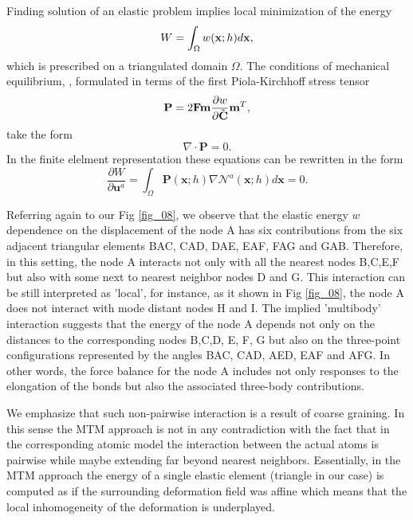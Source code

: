 \documentclass[aps,
superscriptaddress,notitlepage]{revtex4-1}
\begin{document}
Finding  solution of an elastic problem implies  local minimization of the energy 
\begin{equation}
W=\int_{\Omega}w({\bf x}; h)  d\mathbf{x}, 
\end{equation}
which is prescribed on a triangulated  domain \(\Omega\).   The conditions of mechanical equilibrium, , formulated     in terms  of the first Piola-Kirchhoff stress tensor 
\begin{equation}
\mathbf{P}= 2\mathbf{F} \mathbf{m} \frac{\partial w }{\partial \tilde{\bf C}}\mathbf{m}^T,
\end{equation} 
take the form 
$$\nabla\cdot\mathbf{P}=0.$$
In the finite elelment representation these  equations can be rewritten in the form
\begin{equation}
\frac{\partial W}{\partial \mathbf{u}^{a}}=\int_{\Omega} \mathbf{P}(\mathbf{x};h) \nabla \mathcal{N}^{a} (\mathbf{x};h) d\mathbf{x} = 0.
\end{equation} 

Referring again to our Fig \ref{fig_08}, we observe that the elastic  energy $w$ dependence on the displacement of the node A has six contributions from the six adjacent triangular elements BAC, CAD, DAE, EAF, FAG and GAB. Therefore, in this setting,  the node A interacts  not only  with all the  nearest   nodes B,C,E,F but also with some next to nearest neighbor nodes D and G.   This interaction can be still interpreted as 'local', for instance, as it   shown in Fig \ref{fig_08},  the node A does not interact with  mode distant nodes H and I. 
 The implied  'multibody' interaction suggests  that the energy of the node A depends not only on the distances to the corresponding  nodes  B,C,D, E, F, G  but also on the three-point configurations represented by the angles BAC, CAD, AED, EAF and AFG. In other words, the   force balance  for the node A includes  not only responses to the  elongation of the bonds but also the associated  three-body contributions. 

We emphasize  that such non-pairwise  interaction is a result of coarse graining. In this sense the MTM  approach is not  in any  contradiction with the fact that in the corresponding atomic model  the interaction between the actual atoms is pairwise while maybe extending far beyond nearest neighbors. Essentially, in  the  MTM approach  the energy of a single  elastic element (triangle in our case)  is  computed as if the surrounding deformation field was affine which means that the local  inhomogeneity of the deformation is underplayed.   
\end{document}
